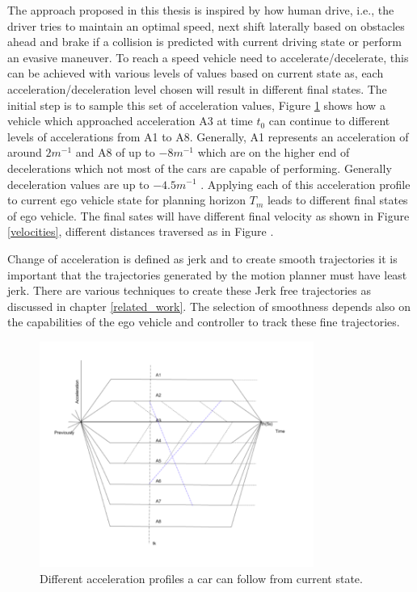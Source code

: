 The approach proposed in this thesis is inspired by how human drive, i.e., the driver tries to maintain an optimal speed, next shift laterally based on obstacles ahead and brake if a collision is predicted with current driving state or perform an evasive maneuver. To reach a speed vehicle need to accelerate/decelerate, this can be achieved with various levels of values based on current state as, each acceleration/deceleration level chosen will result in different final states. The initial step is to sample this set of acceleration values, Figure \ref{accelerations} shows how a vehicle which approached acceleration A3 at time $t_0$ can continue to different levels of accelerations from A1 to A8. Generally, A1 represents an acceleration of around $2m^{-1}$ and A8 of up to $-8m^{-1}$ which are on the higher end of decelerations which not most of the cars are capable of performing. Generally deceleration values are up to $-4.5m^{-1}$ \cite{denmark_breaking} \cite{accelerations_study} \cite{accelerations_study_2}. Applying each of this acceleration profile to current ego vehicle state for planning horizon $ T_m $ leads to different final states of ego vehicle. The final sates will have different final velocity as shown in Figure \ref{velocities}, different distances traversed as in Figure .

Change of acceleration is defined as jerk and to create smooth trajectories it is important that the trajectories generated by the motion planner must have least jerk. There are various techniques to create these Jerk free trajectories as discussed in chapter \ref{related_work}. The selection of smoothness depends also on the capabilities of the ego vehicle and controller to track these fine trajectories.
 
 \begin{figure}[H]
    \centering
    \includegraphics[width=0.8\textwidth]{Images/accelerations.png}
    \caption{Different acceleration profiles a car can follow from current state.}
    \label{accelerations}
\end{figure}

